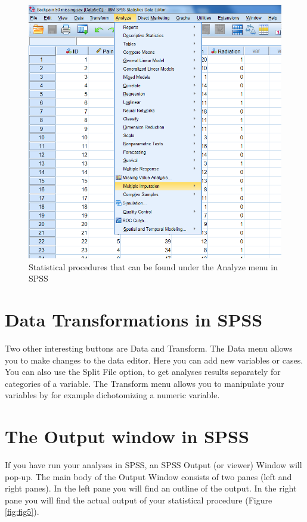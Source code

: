 \documentclass[]{book}
\begin{document}
\begin{figure}

{\centering \includegraphics[width=0.9\linewidth]{images/fig1.4} 

}

\caption{Statistical procedures that can be found under the Analyze menu in SPSS}\label{fig:fig4}
\end{figure}

\section{Data Transformations in
SPSS}\label{data-transformations-in-spss}

Two other interesting buttons are Data and Transform. The Data menu
allows you to make changes to the data editor. Here you can add new
variables or cases. You can also use the Split File option, to get
analyses results separately for categories of a variable. The Transform
menu allows you to manipulate your variables by for example
dichotomizing a numeric variable.

\section{The Output window in SPSS}\label{the-output-window-in-spss}

If you have run your analyses in SPSS, an SPSS Output (or viewer) Window
will pop-up. The main body of the Output Window consists of two panes
(left and right panes). In the left pane you will find an outline of the
output. In the right pane you will find the actual output of your
statistical procedure (Figure \ref{fig:fig5}).
\end{document}
